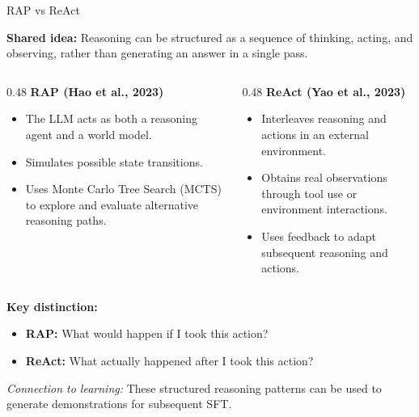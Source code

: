 \documentclass[aspectratio=169]{beamer}
\begin{document}
\begin{frame}{RAP vs ReAct}

\textbf{Shared idea:} Reasoning can be structured as a sequence of thinking, acting, and observing, rather than generating an answer in a single pass.

\vspace{0.3cm}

\begin{columns}[T]
    \begin{column}{0.48\textwidth}
        \textbf{RAP (Hao et al., 2023)}
        \begin{itemize}
            \item The LLM acts as both a reasoning agent and a world model.
            \item Simulates possible state transitions.
            \item Uses Monte Carlo Tree Search (MCTS) to explore and evaluate alternative reasoning paths.
        \end{itemize}
    \end{column}

    \begin{column}{0.48\textwidth}
        \textbf{ReAct (Yao et al., 2023)}
        \begin{itemize}
            \item Interleaves reasoning and actions in an external environment.
            \item Obtains real observations through tool use or environment interactions.
            \item Uses feedback to adapt subsequent reasoning and actions.
        \end{itemize}
    \end{column}
\end{columns}

\vspace{0.4cm}

\textbf{Key distinction:}
\begin{itemize}
    \item \textbf{RAP:} What would happen if I took this action?
    \item \textbf{ReAct:} What actually happened after I took this action?
\end{itemize}
\vspace{0.1cm}
\textit{Connection to learning:} These structured reasoning patterns can be used to generate demonstrations for subsequent SFT.

\end{frame}
\end{document}

